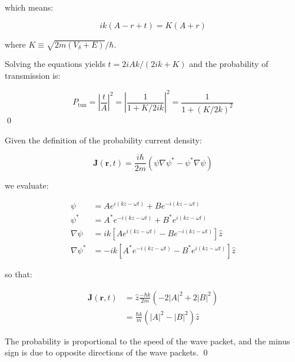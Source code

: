 \documentclass[12pt]{article}
\begin{document}
which means:

\begin{equation}
    ik(A - r + t) = K (A + r)
\end{equation}

where $K \equiv \sqrt{2m(V_{\delta} + E)}/\hbar$.

Solving the equations yields $t = 2iAk/(2ik + K)$ and the probability of transmission is:

\begin{equation}
    P_{\text{tun}} = \left\lvert \frac{t}{A} \right\rvert^{2} = \left\lvert \frac{1}{1 + K/2ik} \right\rvert^{2} = \frac{1}{1 + (K/2k)^{2}}
\end{equation}
\qed


Given the definition of the probability current density:

\begin{equation}
    \mathbf{J}(\mathbf{r}, t) = \frac{i\hbar}{2m} \left( \psi \nabla \psi^{*} - \psi^{*} \nabla \psi \right)
\end{equation}

we evaluate:

\begin{equation}
\begin{split}
    \psi &= A e^{i(kz - \omega t)} + B e^{-i(kz - \omega t)} \\
    \psi^{*} &= A^{*} e^{-i(kz - \omega t)} + B^{*} e^{i(kz - \omega t)} \\
    \nabla \psi &= ik \left[ A e^{i(kz - \omega t)} - B e^{-i(kz - \omega t)} \right] \hat{z} \\
    \nabla \psi^{*} &= -ik \left[ A^{*} e^{-i(kz - \omega t)} - B^{*} e^{i(kz - \omega t)} \right] \hat{z}
\end{split}
\end{equation}

so that:

\begin{equation}
\begin{split}
    \mathbf{J}(\mathbf{r}, t) &= \hat{z} \frac{-\hbar k}{2m} \left( -2\left\lvert A \right\rvert^{2} + 2\left\lvert B \right\rvert^{2} \right) \\
    &= \frac{\hbar k}{m} \left( \left\lvert A \right\rvert^{2} - \left\lvert B \right\rvert^{2} \right) \hat{z}
\end{split}
\end{equation}

The probability is proportional to the speed of the wave packet, and the minus sign is due to opposite directions of the wave packets.
\qed
\end{document}

